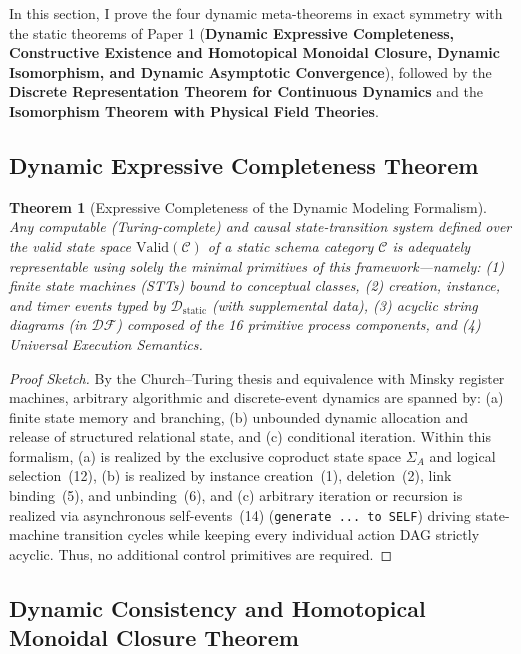 \documentclass[11pt,a4paper]{article}
\theoremstyle{definition}
\theoremstyle{plain}
\newtheorem{theorem}{Theorem}[section]
\theoremstyle{remark}
\newcommand{\Valid}{\mathrm{Valid}}
\newcommand{\DF}{\mathcal{DF}}
\newcommand{\Dstatic}{\mathcal{D}_{\mathrm{static}}}
\begin{document}
In this section, I prove the four dynamic meta-theorems in exact symmetry with the static theorems of Paper 1 (\textbf{Dynamic Expressive Completeness, Constructive Existence and Homotopical Monoidal Closure, Dynamic Isomorphism, and Dynamic Asymptotic Convergence}), followed by the \textbf{Discrete Representation Theorem for Continuous Dynamics} and the \textbf{Isomorphism Theorem with Physical Field Theories}.

\subsection{Dynamic Expressive Completeness Theorem}

\begin{theorem}[Expressive Completeness of the Dynamic Modeling Formalism]\label{thm:dyn-comp}
Any computable (Turing-complete) and causal state-transition system defined over the valid state space $\Valid(\mathcal{C})$ of a static schema category $\mathcal{C}$ is adequately representable using solely the minimal primitives of this framework---namely: (1) finite state machines (STTs) bound to conceptual classes, (2) creation, instance, and timer events typed by $\Dstatic$ (with supplemental data), (3) acyclic string diagrams (in $\DF$) composed of the 16 primitive process components, and (4) Universal Execution Semantics.
\end{theorem}

\begin{proof}[Proof Sketch]
By the Church--Turing thesis and equivalence with Minsky register machines, arbitrary algorithmic and discrete-event dynamics are spanned by: (a) finite state memory and branching, (b) unbounded dynamic allocation and release of structured relational state, and (c) conditional iteration. Within this formalism, (a) is realized by the exclusive coproduct state space $\Sigma_A$ and logical selection~(12), (b) is realized by instance creation~(1), deletion~(2), link binding~(5), and unbinding~(6), and (c) arbitrary iteration or recursion is realized via asynchronous self-events~(14) (\texttt{generate ... to SELF}) driving state-machine transition cycles while keeping every individual action DAG strictly acyclic. Thus, no additional control primitives are required.
\end{proof}

\subsection{Dynamic Consistency and Homotopical Monoidal Closure Theorem}
\end{document}
